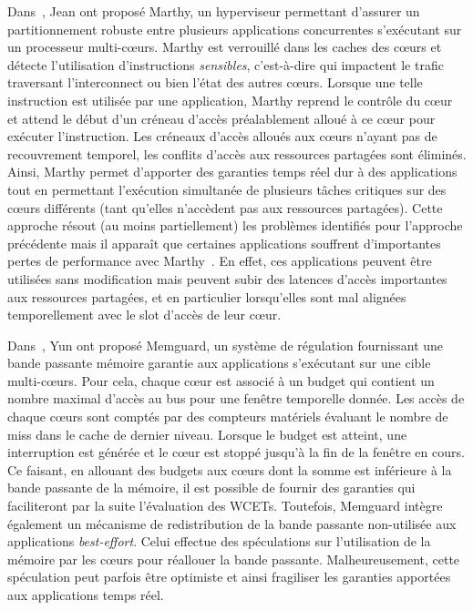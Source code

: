 \documentclass[main.tex]{subfiles}
\begin{document}
Dans~\cite{jean12}, Jean \etal ont proposé {\sc Marthy}, un hyperviseur permettant d'assurer un partitionnement robuste entre plusieurs applications concurrentes s'exécutant sur un processeur multi-c\oe{}urs. {\sc Marthy} est verrouillé dans les caches des c\oe{}urs et détecte l'utilisation d'instructions \emph{sensibles}, c'est-à-dire qui impactent le trafic traversant l'interconnect ou bien l'état des autres c\oe{}urs. Lorsque une telle instruction est utilisée par une application, {\sc Marthy} reprend le contrôle du c\oe{}ur et attend le début d'un créneau d'accès préalablement alloué à ce c\oe{}ur pour exécuter l'instruction. Les créneaux d'accès alloués aux c\oe{}urs n'ayant pas de recouvrement temporel, les conflits d'accès aux ressources partagées sont éliminés. Ainsi, {\sc Marthy} permet d'apporter des garanties temps réel dur à des applications tout en permettant l'exécution simultanée de plusieurs tâches critiques sur des c\oe{}urs différents (tant qu'elles n'accèdent pas aux ressources partagées). Cette approche résout (au moins partiellement) les problèmes identifiés pour l'approche précédente mais il apparaît que certaines applications souffrent d'importantes pertes de performance avec {\sc Marthy}~\cite{Jean2015}. En effet, ces applications peuvent être utilisées sans modification mais peuvent subir des latences d'accès importantes aux ressources partagées, et en particulier lorsqu'elles sont mal alignées temporellement avec le slot d'accès de leur c\oe{}ur.

Dans~\cite{Yun2013}, Yun \etal ont proposé Memguard, un système de régulation fournissant une bande passante mémoire garantie aux applications s'exécutant sur une cible multi-c\oe{}urs. Pour cela, chaque c\oe{}ur est associé à un budget qui contient un nombre maximal d'accès au bus pour une fenêtre temporelle donnée. Les accès de chaque c\oe{}urs sont comptés par des compteurs matériels évaluant le nombre de miss dans le cache de dernier niveau. Lorsque le budget est atteint, une interruption est générée et le c\oe{}ur est stoppé jusqu'à la fin de la fenêtre en cours. Ce faisant, en allouant des budgets aux c\oe{}urs dont la somme est inférieure à la bande passante de la mémoire, il est possible de fournir des garanties qui faciliteront par la suite l'évaluation des WCETs. Toutefois, Memguard intègre également un mécanisme de redistribution de la bande passante non-utilisée aux applications \emph{best-effort}. Celui effectue des spéculations sur l'utilisation de la mémoire par les c\oe{}urs pour réallouer la bande passante. Malheureusement, cette spéculation peut parfois être optimiste et ainsi fragiliser les garanties apportées aux applications temps réel. \\
\end{document}
